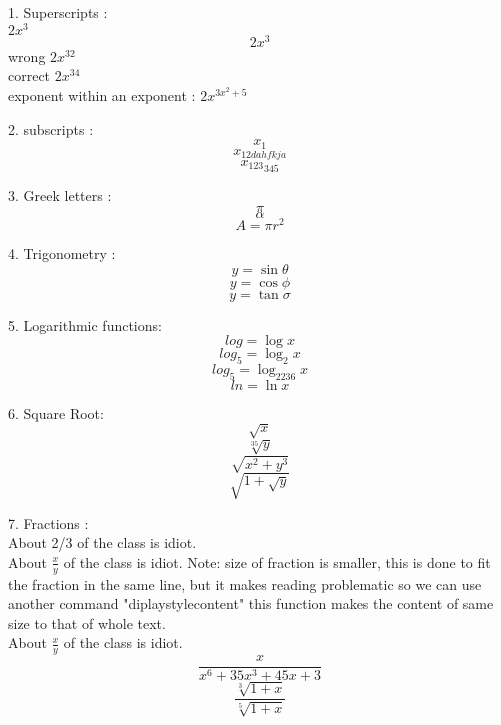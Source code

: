 \documentclass[10pt]{article}
\begin{document}
1. Superscripts : \\
 $ 2x^3$ \\
 $$ 2x^3$$
wrong  $ 2x^32$\\
correct $ 2x^{34}$\\
exponent within an exponent : $ 2x^{3x^2+5}$

2. subscripts :\\ 
$$ x_1$$
$$ x_{12dahfkja} $$
$$ {x_{123}}_{345}$$ 

3. Greek letters :\\
$$ \pi $$
$$ \alpha $$
$$ A = \pi r^2 $$

4. Trigonometry :\\
$$  y = \sin{\theta}$$
$$ y = \cos{\phi} $$
$$ y = \tan{\sigma}$$

5. Logarithmic functions:
$$ log = \log{x} $$
$$ log_5 = \log_2{x}$$
$$ log_5 = \log_{2236}{x}$$
$$ ln = \ln{x} $$

6. Square Root: 
$$ \sqrt{x}$$
$$ \sqrt[35]{y}$$
$$ \sqrt{x^2+y^3}$$
$$  \sqrt{1+\sqrt{y}}$$

7. Fractions : \\
About 2/3  of the class is idiot.\\
About $\frac{x}{y} $ of the class is idiot.
Note: size of fraction is smaller, this is done to fit the fraction in the same line, but it makes reading problematic so we can use another command "diplaystyle{content}" this function makes the content of same size to that of whole text.\\

About $\displaystyle{\frac{x}{y}} $ of the class is idiot.
$$ \frac{x}{x^6+35x^3+45x+3}$$
$$ \frac{\sqrt[3]{1+x}}{\sqrt[5]{1+x}}$$
\end{document}

